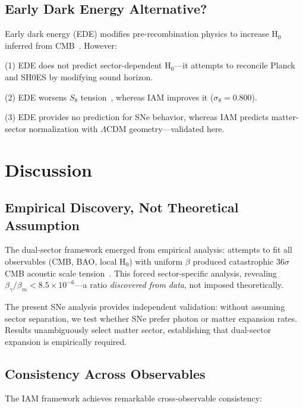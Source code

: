 \documentclass[twocolumn,superscriptaddress,prd,amsmath,amssymb]{revtex4-2}
\begin{document}
\subsection{Early Dark Energy Alternative?}

Early dark energy (EDE) modifies pre-recombination physics to increase H$_0$ inferred from CMB~\cite{Kamionkowski2023}. However:

(1) EDE does not predict sector-dependent H$_0$—it attempts to reconcile Planck and SH0ES by modifying sound horizon.

(2) EDE worsens $S_8$ tension~\cite{Hill2020}, whereas IAM improves it ($\sigma_8 = 0.800$).

(3) EDE provides no prediction for SNe behavior, whereas IAM predicts matter-sector normalization with $\Lambda$CDM geometry—validated here.

\section{Discussion}

\subsection{Empirical Discovery, Not Theoretical Assumption}

The dual-sector framework emerged from empirical analysis: attempts to fit all observables (CMB, BAO, local H$_0$) with uniform $\beta$ produced catastrophic 36$\sigma$ CMB acoustic scale tension~\cite{IAMManuscript2025}. This forced sector-specific analysis, revealing $\beta_\gamma/\beta_m < 8.5 \times 10^{-6}$—a ratio \textit{discovered from data}, not imposed theoretically.

The present SNe analysis provides independent validation: without assuming sector separation, we test whether SNe prefer photon or matter expansion rates. Results unambiguously select matter sector, establishing that dual-sector expansion is empirically required.

\subsection{Consistency Across Observables}

The IAM framework achieves remarkable cross-observable consistency:
\end{document}
